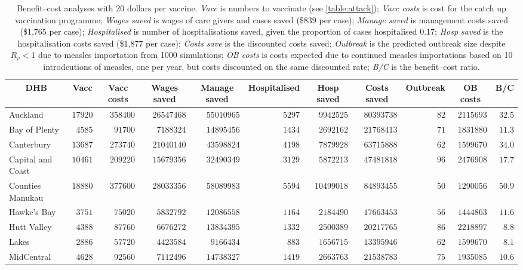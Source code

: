\documentclass{article}
\begin{document}
\begin{table}\small
\caption{Benefit--cost analyses with 20 dollars per vaccine. \textit{Vacc} is numbers to vaccinate (see \autoref{table:attack}); \textit{Vacc costs} is cost for the catch up vaccination programme; \textit{Wages saved} is wages of care givers and cases saved (\$839 per case); \textit{Manage saved} is management costs saved (\$1,765 per case); \textit{Hospitalised} is number of hospitalisations saved, given the proportion of cases hospitalised 0.17; \textit{Hosp saved} is the hospitalisation costs saved (\$1,877 per case); \textit{Costs save}	is the discounted costs saved; \textit{Outbreak}	is the predicted outbreak size despite $R_v < 1$ due to measles importation from 1000 simulations; \textit{OB costs}	is costs expected due to continued measles importations based on 10 introdcutions of measles, one per year, but costs discounted on the same discounted rate; \textit{B/C} is the benefit--cost ratio.}
\begin{center}
\begin{tabular}{lrrrrrrrrrr}
\hline\hline
\multicolumn{1}{c}{DHB}&\multicolumn{1}{c}{Vacc}&\multicolumn{1}{c}{Vacc costs}&\multicolumn{1}{c}{Wages saved}&\multicolumn{1}{c}{Manage saved}&\multicolumn{1}{c}{Hospitalised}&\multicolumn{1}{c}{Hosp saved}&\multicolumn{1}{c}{Costs saved}&\multicolumn{1}{c}{Outbreak}&\multicolumn{1}{c}{OB costs}&\multicolumn{1}{c}{B/C}\tabularnewline
\hline
Auckland&$17920$&$358400$&$26547468$&$55010965$&$5297$&$ 9942525$&$80393738$&$ 82$&$2115693$&$32.5$\tabularnewline
Bay of Plenty&$ 4585$&$ 91700$&$ 7188324$&$14895456$&$1434$&$ 2692162$&$21768413$&$ 71$&$1831880$&$11.3$\tabularnewline
Canterbury&$13687$&$273740$&$21040140$&$43598824$&$4198$&$ 7879928$&$63715888$&$ 62$&$1599670$&$34.0$\tabularnewline
Capital and Coast&$10461$&$209220$&$15679356$&$32490349$&$3129$&$ 5872213$&$47481818$&$ 96$&$2476908$&$17.7$\tabularnewline
Counties Manukau&$18880$&$377600$&$28033356$&$58089983$&$5594$&$10499018$&$84893455$&$ 50$&$1290056$&$50.9$\tabularnewline
Hawke's Bay&$ 3751$&$ 75020$&$ 5832792$&$12086558$&$1164$&$ 2184490$&$17663453$&$ 56$&$1444863$&$11.6$\tabularnewline
Hutt Valley&$ 4388$&$ 87760$&$ 6676272$&$13834395$&$1332$&$ 2500389$&$20217765$&$ 86$&$2218897$&$ 8.8$\tabularnewline
Lakes&$ 2886$&$ 57720$&$ 4423584$&$ 9166434$&$ 883$&$ 1656715$&$13395946$&$ 62$&$1599670$&$ 8.1$\tabularnewline
MidCentral&$ 4628$&$ 92560$&$ 7112496$&$14738327$&$1419$&$ 2663763$&$21538783$&$ 75$&$1935085$&$10.6$\tabularnewline

\end{tabular}
\end{center}
\end{table}
\end{document}
